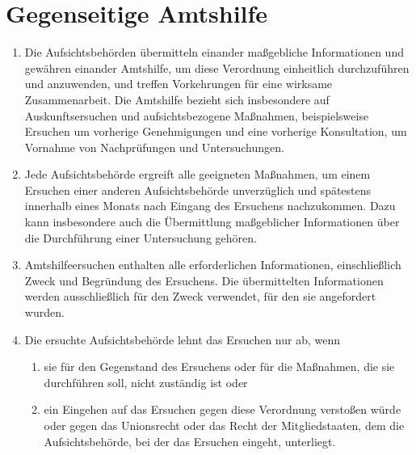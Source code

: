 \chapter{Gegenseitige Amtshilfe}
\label{ch:61}


\begin{enumerate}

  \item Die Aufsichtsbehörden übermitteln einander maßgebliche Informationen und gewähren einander Amtshilfe, um diese
   Verordnung einheitlich durchzuführen und anzuwenden, und treffen Vorkehrungen für eine wirksame Zusammenarbeit. Die
   Amtshilfe bezieht sich insbesondere auf Auskunftsersuchen und aufsichtsbezogene Maßnahmen, beispielsweise Ersuchen
   um vorherige Genehmigungen und eine vorherige Konsultation, um Vornahme von Nachprüfungen und Untersuchungen.
  \label{itm:61-1}

  \item Jede Aufsichtsbehörde ergreift alle geeigneten Maßnahmen, um einem Ersuchen einer anderen Aufsichtsbehörde
   unverzüglich und spätestens innerhalb eines Monats nach Eingang des Ersuchens nachzukommen. Dazu kann insbesondere
   auch die Übermittlung maßgeblicher Informationen über die Durchführung einer Untersuchung gehören.
  \label{itm:61-2}

  \item Amtshilfeersuchen enthalten alle erforderlichen Informationen, einschließlich Zweck und Begründung des
   Ersuchens. Die übermittelten Informationen werden ausschließlich für den Zweck verwendet, für den sie angefordert
   wurden.
  \label{itm:61-3}

  \item Die ersuchte Aufsichtsbehörde lehnt das Ersuchen nur ab, wenn
  \label{itm:61-4}

  \begin{enumerate}
  
    \item sie für den Gegenstand des Ersuchens oder für die Maßnahmen, die sie durchführen soll, nicht zuständig ist
     oder
    \label{itm:61-4a}

    \item ein Eingehen auf das Ersuchen gegen diese Verordnung verstoßen würde oder gegen das Unionsrecht oder das Recht
     der Mitgliedstaaten, dem die Aufsichtsbehörde, bei der das Ersuchen eingeht, unterliegt.
    \label{itm:61-4b}


\end{enumerate}
\end{enumerate}

